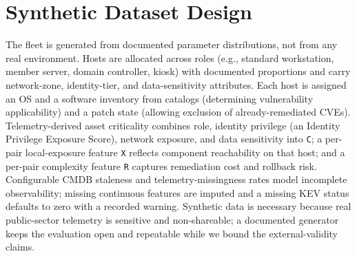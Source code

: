 \section{Synthetic Dataset Design}

The fleet is generated from documented parameter distributions, not from any real
environment. Hosts are allocated across roles (e.g., standard workstation, member
server, domain controller, kiosk) with documented proportions and carry
network-zone, identity-tier, and data-sensitivity attributes. Each host is assigned
an OS and a software inventory from catalogs (determining vulnerability
applicability) and a patch state (allowing exclusion of already-remediated CVEs).
Telemetry-derived asset criticality combines role, identity privilege (an Identity
Privilege Exposure Score), network exposure, and data sensitivity into \texttt{C}; a
per-pair local-exposure feature \texttt{X} reflects component reachability on that host;
and a per-pair complexity feature \texttt{R} captures remediation cost and rollback risk.
Configurable CMDB staleness and telemetry-missingness rates model incomplete
observability; missing continuous features are imputed and a missing KEV status
defaults to zero with a recorded warning. Synthetic data is necessary because real
public-sector telemetry is sensitive and non-shareable; a documented generator
keeps the evaluation open and repeatable while we bound the external-validity
claims.

